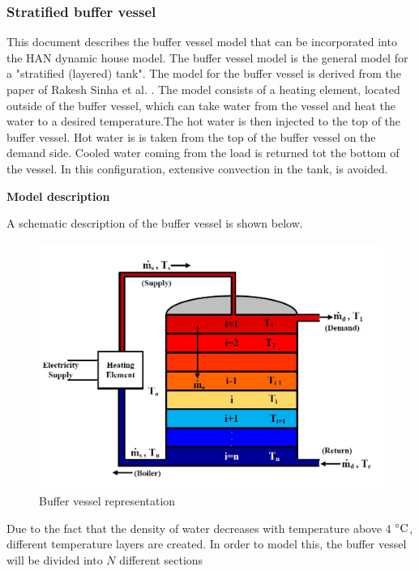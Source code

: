 \subsubsection{Stratified buffer vessel}

This document describes the buffer vessel model that can be incorporated into the HAN dynamic house model. The buffer vessel model is the general model for a "stratified (layered) tank". The model for the buffer vessel is derived from the paper of Rakesh Sinha et al. \cite{sinha2020flexibility}. The model consists of a heating element, located outside of the buffer vessel, which can take water from the vessel and heat the water to a desired temperature.The hot water is then injected to the top of the buffer vessel. Hot water is is taken from the top of the buffer vessel on the demand side. Cooled water coming from the load is returned tot the bottom of the vessel. In this configuration, extensive convection in the tank, is avoided. 

\textbf{Model description}

A schematic description of the buffer vessel is shown below.

\begin{figure}[H]
	\centering
	\includegraphics[width=0.8\columnwidth]{Figures/buffervessel_setup.JPG}
	\caption[Short title]{Buffer vessel representation}
\end{figure}

Due to the fact that the density of water decreases with temperature above 4 $^\circ\mathrm{C}$, different temperature layers are created. In order to model this, the buffer vessel will be divided into $N$ different sections 

